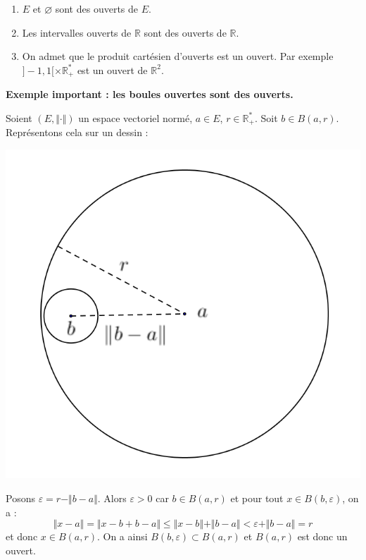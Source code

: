 \documentclass[french,11pt,twoside]{VcCours}
\begin{document}
\begin{Exemples}
\begin{enumerate}
\item $E$ et $\varnothing$ sont des ouverts de $E$.
\item Les intervalles ouverts de $\mathbb{R}$ sont des ouverts de $\mathbb{R}$.
\item On admet que le produit cartésien d'ouverts est un ouvert. Par exemple $]-1,1[ \times \mathbb{R}_{+}^*$ est un ouvert de $\mathbb{R}^2$.
\end{enumerate}
\end{Exemples}

\medskip

\textbf{Exemple important : les boules ouvertes sont des ouverts.}

Soient $(E, \Vert \cdot \Vert)$ un espace vectoriel normé, $a \in E$, $r \in \mathbb{R}_+^*$. Soit $b \in B(a,r)$. Représentons cela sur un dessin :

\begin{center}
\includegraphics[scale=0.4]{BouleOuv}
\end{center}

\vspace*{4cm}

%
Posons $\varepsilon = r - \Vert b-a \Vert$. Alors $\varepsilon>0$ car $b \in B(a,r)$ et pour tout $x \in B(b, \varepsilon)$, on a :
$$ \Vert  x - a \Vert  = \Vert  x - b + b- a \Vert \leq \Vert  x - b \Vert + \Vert  b - a \Vert <\varepsilon + \Vert  b - a \Vert =  r$$
et donc $x \in  B(a,r)$. On a ainsi $B(b, \varepsilon) \subset B(a,r)$ et $B(a,r)$ est donc un ouvert.
\end{document}
